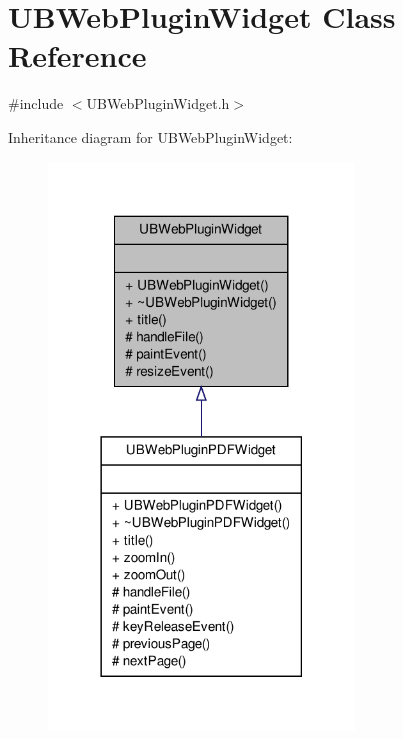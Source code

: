 \hypertarget{class_u_b_web_plugin_widget}{\section{U\-B\-Web\-Plugin\-Widget Class Reference}
\label{d4/df7/class_u_b_web_plugin_widget}
}


{\ttfamily \#include $<$U\-B\-Web\-Plugin\-Widget.\-h$>$}



Inheritance diagram for U\-B\-Web\-Plugin\-Widget\-:
\nopagebreak
\begin{figure}[H]
\begin{center}
\leavevmode
\includegraphics[width=230pt]{db/d60/class_u_b_web_plugin_widget__inherit__graph}
\end{center}
\end{figure}


